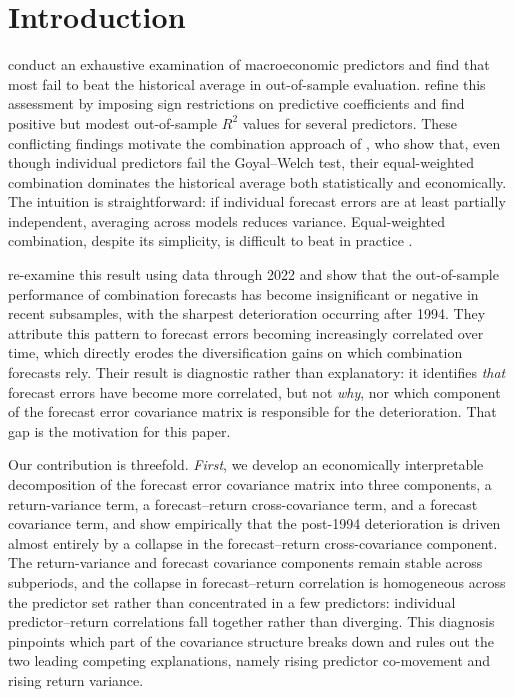 \documentclass[a4paper,11pt]{article}
\begin{document}
\section{Introduction}\label{sec:intro}

\citet{goyalwelch2008} conduct an exhaustive examination of macroeconomic
predictors and find that most fail to beat the historical average in
out-of-sample evaluation. \citet{campbellthompson2008} refine this
assessment by imposing sign restrictions on predictive coefficients and
find positive but modest out-of-sample $R^{2}$ values for several
predictors. These conflicting findings motivate the combination approach
of \citet{rsz2010}, who show that, even though individual predictors fail
the Goyal--Welch test, their equal-weighted combination dominates the
historical average both statistically and economically. The intuition is
straightforward: if individual forecast errors are at least partially
independent, averaging across models reduces variance. Equal-weighted
combination, despite its simplicity, is difficult to beat in practice
\citep{timmermann2006}.

\citet{denkloffler2024} re-examine this result using data through 2022 and
show that the out-of-sample performance of combination forecasts has
become insignificant or negative in recent subsamples, with the sharpest
deterioration occurring after 1994. They attribute this pattern to
forecast errors becoming increasingly correlated over time, which directly
erodes the diversification gains on which combination forecasts rely.
Their result is diagnostic rather than explanatory: it identifies
\textit{that} forecast errors have become more correlated, but not
\textit{why}, nor which component of the forecast error covariance matrix
is responsible for the deterioration. That gap is the motivation for this
paper.

Our contribution is threefold. \textit{First}, we develop an economically
interpretable decomposition of the forecast error covariance matrix into
three components, a return-variance term, a forecast--return
cross-covariance term, and a forecast covariance term, and show
empirically that the post-1994 deterioration is driven almost entirely by
a collapse in the forecast--return cross-covariance component. The
return-variance and forecast covariance components remain stable across
subperiods, and the collapse in forecast--return correlation is
homogeneous across the predictor set rather than concentrated in a few
predictors: individual predictor--return correlations fall together rather
than diverging. This diagnosis pinpoints which part of the covariance
structure breaks down and rules out the two leading competing
explanations, namely rising predictor co-movement and rising return
variance.
\end{document}
